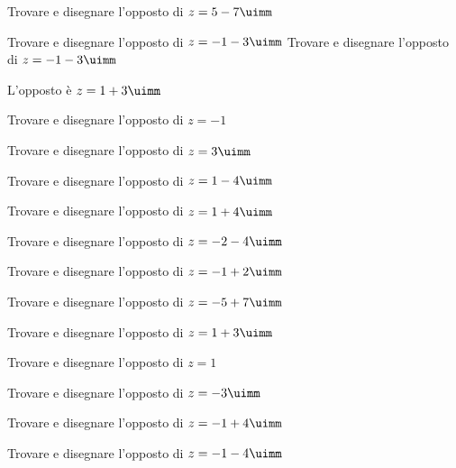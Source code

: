 \begin{exercise}[no solution]
	Trovare e disegnare l'opposto di  $z=5-7\uimm$
\end{exercise}
\begin{exercise}
	Trovare e disegnare l'opposto di $z=-1-3\uimm$
	\tcblower
	Trovare e disegnare l'opposto di $z=-1-3\uimm$
	
	L'opposto è $z=1+3\uimm$
	\begin{center}
		
		\label{fig:disegnopianocomplesso14}
	\end{center}
\end{exercise}
\begin{exercise}[no solution]
	Trovare e disegnare l'opposto di  $z=-1$
\end{exercise}
\begin{exercise}[no solution]
	Trovare e disegnare l'opposto di  $z=3\uimm$
\end{exercise}
\begin{exercise}[no solution]
	Trovare e disegnare l'opposto di  $z=1-4\uimm$
\end{exercise}
\begin{exercise}[no solution]
	Trovare e disegnare l'opposto di  $z=1+4\uimm$
\end{exercise}
%
\begin{exercise}[no solution]
	Trovare e disegnare l'opposto di $z=-2-4\uimm$
\end{exercise}
\begin{exercise}[no solution]
	Trovare e disegnare l'opposto di $z=-1+2\uimm$
\end{exercise}
\begin{exercise}[no solution]
	Trovare e disegnare l'opposto di  $z=-5+7\uimm$
\end{exercise}
\begin{exercise}[no solution]
	Trovare e disegnare l'opposto di  $z=1+3\uimm$
\end{exercise}
\begin{exercise}[no solution]
	Trovare e disegnare l'opposto di  $z=1$
\end{exercise}
\begin{exercise}[no solution]
	Trovare e disegnare l'opposto di  $z=-3\uimm$
\end{exercise}
\begin{exercise}[no solution]
	Trovare e disegnare l'opposto di  $z=-1+4\uimm$
\end{exercise}
\begin{exercise}[no solution]
	Trovare e disegnare l'opposto di  $z=-1-4\uimm$
\end{exercise}
